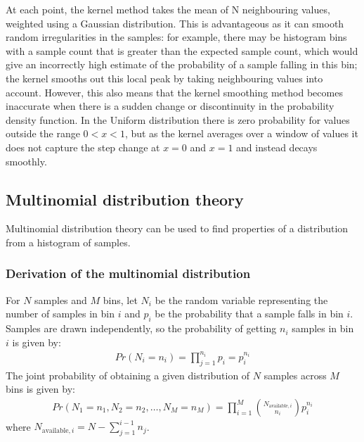 \documentclass[a4paper]{article}
\begin{document}
At each point, the kernel method takes the mean of N neighbouring values, weighted using a Gaussian distribution.
This is advantageous as it can smooth random irregularities in the samples: for example, there may be histogram bins
with a sample count that is greater than the expected sample count, which would give an incorrectly high estimate of
the probability of a sample falling in this bin; the kernel smooths out this local peak by taking neighbouring values
into account.
However, this also means that the kernel smoothing method becomes inaccurate when there is a sudden change or
discontinuity in the probability density function.
In the Uniform distribution there is zero probability for values outside the range $0<x<1$, but as the kernel averages
over a window of values it does not capture the step change at $x=0$ and $x=1$ and instead decays smoothly.


\subsection{Multinomial distribution theory}

Multinomial distribution theory can be used to find properties of a distribution from a histogram of samples.

\subsubsection{Derivation of the multinomial distribution}
For $N$ samples and $M$ bins, let $N_i$ be the random variable representing the number of samples in bin $i$ and $p_i$
be the probability that a sample falls in bin $i$.
Samples are drawn independently, so the probability of getting $n_i$ samples in bin $i$ is given by:
\begin{align*}
    Pr(N_i = n_i) = \prod_{j=1}^{n_i} p_i = p_i^{n_i}
\end{align*}
The joint probability of obtaining a given distribution of $N$ samples across $M$ bins is given by:
\begin{align}
    \label{eq:joint_bin_probability_1}
    Pr(N_1 = n_1, N_2 = n_2, \dots, N_M= n_M) =
     \prod_{i=1}^{M} {N_{\text{available}, i} \choose {n_i}} p_i^{n_i}
\end{align}
where $N_{\text{available}, i} = N - \sum_{j=1}^{i-1} n_j$.
\end{document}
